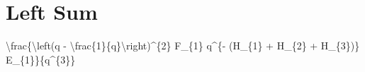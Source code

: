\documentclass{article}%
\begin{document}
%
\normalsize%
\section{Left Sum}%
\label{sec:LeftSum}%
\textbackslash{}frac\{\textbackslash{}left(q {-} \textbackslash{}frac\{1\}\{q\}\textbackslash{}right)\^{}\{2\} F\_\{1\} q\^{}\{{-} (H\_\{1\} + H\_\{2\} + H\_\{3\})\} E\_\{1\}\}\{q\^{}\{3\}\}%
\newline%

%
\end{document}
